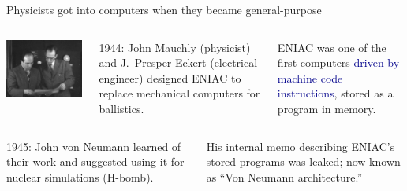 \documentclass[aspectratio=169]{beamer}
\begin{document}
\begin{frame}{Physicists got into computers when they became general-purpose}
\vspace{0.5 cm}

\begin{columns}
\includegraphics[width=\linewidth]{presper-and-mauchly.jpg}

1944: John Mauchly (physicist) and J.\ Presper Eckert (electrical engineer) designed ENIAC to replace mechanical computers for ballistics.

\vspace{0.25 cm}
ENIAC was one of the first computers \textcolor{darkblue}{driven by machine code instructions}, stored as a program in memory.
\end{columns}

\vspace{0.25 cm}
\begin{columns}
1945: John von Neumann learned of their work and suggested using it for nuclear simulations (H-bomb).

\vspace{0.25 cm}
His internal memo describing ENIAC's stored programs was leaked; now known as ``Von Neumann architecture.''


\end{columns}
\end{frame}
\end{document}
